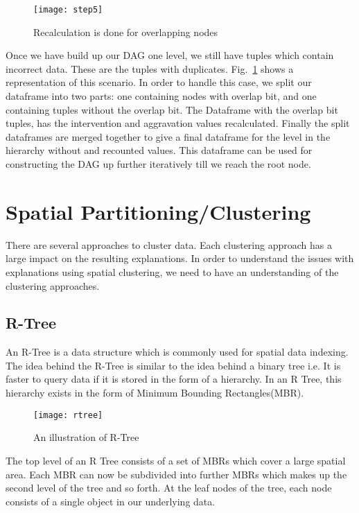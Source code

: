 \begin{figure}[h]
\texttt{[image: step5]}
\caption{Recalculation is done for overlapping nodes}
\label{fig:step4}
\end{figure}

Once we have build up our DAG one level, we still have tuples which contain incorrect data. These are the tuples with duplicates. Fig.~\ref{fig:step4} shows a representation of this scenario. In order to handle this case, we split our dataframe into two parts: one containing nodes with overlap bit, and one containing tuples without the overlap bit. The Dataframe with the overlap bit tuples, has the intervention and aggravation values recalculated. Finally the split dataframes are merged together to give a final dataframe for the level in the hierarchy without and recounted values. This dataframe can be used for constructing the DAG up further iteratively till we reach the root node.

\section{Spatial Partitioning/Clustering}
There are several approaches to cluster data. Each clustering approach has a large impact on the resulting explanations. In order to understand the issues with explanations using spatial clustering, we need to have an understanding of the clustering approaches.

\subsection{R-Tree}
An R-Tree is a data structure which is commonly used for spatial data indexing. The idea behind the R-Tree is similar to the idea behind a binary tree i.e. It is faster to query data if it is stored in the form of a hierarchy\citep{guttman1984r}. In an R Tree, this hierarchy exists in the form of Minimum Bounding Rectangles(MBR).

\begin{figure}[ht]
\texttt{[image: rtree]}
\caption{An illustration of R-Tree}
\label{fig:rtree}
\end{figure}

The top level of an R Tree consists of a set of MBRs which cover a large spatial area. Each MBR can now be subdivided into further MBRs which makes up the second level of the tree and so forth. At the leaf nodes of the tree, each node consists of a single object in our underlying data.


